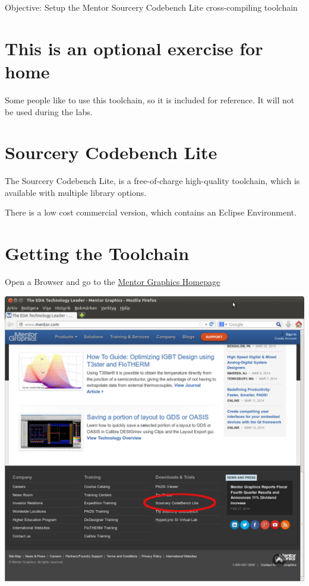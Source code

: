   {Objective: Setup the Mentor Sourcery Codebench Lite cross-compiling toolchain}

\section{This is an optional exercise for home}

Some people like to use this toolchain, so it is included for reference.
It will not be used during the labs.

\section{Sourcery Codebench Lite}
The Sourcery Codebench Lite, is a free-of-charge high-quality toolchain,
which is available with multiple library options.

There is a low cost commercial version, which contains an Eclipse Environment.
\clearpage
\section{Getting the Toolchain}

Open a Browser and go to the \href{http://www.mentor.com/}{Mentor Graphics Homepage} \\
\begin{center}
  \includegraphics[width=\textwidth]{labs/setup-codesourcery/Mentor_Homepage.png}
\end{center}

